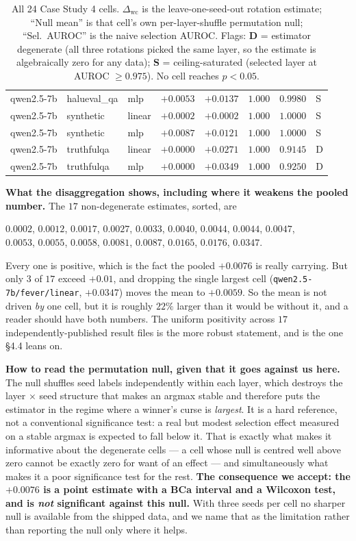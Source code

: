 \documentclass[10pt]{article} %
\begin{document}
\begin{table}[h]
\begin{tabular}{lllrrrrl}
qwen2.5-7b & halueval\_qa & mlp & $+0.0053$ & $+0.0137$ & $1.000$ & $0.9980$ & S \\
qwen2.5-7b & synthetic & linear & $+0.0002$ & $+0.0002$ & $1.000$ & $1.0000$ & S \\
qwen2.5-7b & synthetic & mlp & $+0.0087$ & $+0.0121$ & $1.000$ & $1.0000$ & S \\
qwen2.5-7b & truthfulqa & linear & $+0.0000$ & $+0.0271$ & $1.000$ & $0.9145$ & D \\
qwen2.5-7b & truthfulqa & mlp & $+0.0000$ & $+0.0349$ & $1.000$ & $0.9250$ & D \\
\bottomrule
\end{tabular}
\caption{All 24 Case Study 4 cells. $\Delta_{\text{wc}}$ is the
leave-one-seed-out rotation estimate; ``Null mean'' is that cell's own
per-layer-shuffle permutation null; ``Sel.\ AUROC'' is the naive
selection AUROC. Flags: \textbf{D} = estimator degenerate (all three rotations
picked the same layer, so the estimate is algebraically zero for any data);
\textbf{S} = ceiling-saturated (selected layer at AUROC $\geq0.975$). No cell
reaches $p<0.05$.}
\label{tab:cs4-cells}
\end{table}

\textbf{What the disaggregation shows, including where it weakens the pooled
number.} The $17$ non-degenerate estimates, sorted, are
%
\begin{center}\small
$0.0002$, $0.0012$, $0.0017$, $0.0027$, $0.0033$, $0.0040$, $0.0044$, $0.0044$,
$0.0047$,\\
$0.0053$, $0.0055$, $0.0058$, $0.0081$, $0.0087$, $0.0165$, $0.0176$, $0.0347$.
\end{center}
%
Every one
is positive, which is the fact the pooled $+0.0076$ is really carrying. But
only $3$ of $17$ exceed $+0.01$, and dropping the single largest cell
(\texttt{qwen2.5-7b/fever/linear}, $+0.0347$) moves the mean to $+0.0059$.
So the mean is not driven \emph{by} one cell, but it is roughly $22\%$ larger
than it would be without it, and a reader should have both numbers. The
uniform positivity across $17$ independently-published result files is the
more robust statement, and is the one §4.4 leans on.

\textbf{How to read the permutation null, given that it goes against us here.}
The null shuffles seed labels independently within each layer, which destroys
the layer $\times$ seed structure that makes an argmax stable and therefore
puts the estimator in the regime where a winner's curse is \emph{largest}. It
is a hard reference, not a conventional significance test: a real but modest
selection effect measured on a stable argmax is expected to fall below it. That
is exactly what makes it informative about the degenerate cells --- a cell whose
null is centred well above zero cannot be exactly zero for want of an effect ---
and simultaneously what makes it a poor significance test for the rest.
\textbf{The consequence we accept: the $+0.0076$ is a point estimate with a BCa
interval and a Wilcoxon test, and is \emph{not} significant against this null.}
With three seeds per cell no sharper null is available from the shipped data,
and we name that as the limitation rather than reporting the null only where it
helps.
\end{document}
